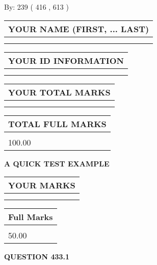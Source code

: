 \documentclass[12pt]{article}
\begin{document}
   
\hspace{1.0in} By: 
 239 ( 416 ,  613 )
   
   
   
   
\newpage 
\setcounter{page}{ 
   433001 } 
   
   
   
   
\noindent\begin{tabular}{|l|}
\hline
YOUR NAME (FIRST, ... LAST)  \\
\hline
 \\ 
 \\ 
\hline
\end{tabular}
\hspace{0.05in} \begin{tabular}{|l|}
\hline
 YOUR   ID   INFORMATION  \\
\hline
 \\ 
 \\ 
\hline
\end{tabular}
   
   
\vspace{0.2in}\noindent\begin{tabular}{|l|}
\hline
YOUR TOTAL MARKS  \\
\hline
 \\ 
 \\ 
\hline
\end{tabular}
\hspace{0.05in} \begin{tabular}{|l|}
\hline
TOTAL FULL MARKS  \\
\hline
 \\ 
100.00 \\
\hline
\end{tabular}
   
   
 \vspace{0.2in}
{\LARGE {\textbf{ A QUICK TEST EXAMPLE}}}
   
   
  
\vspace{0.2in}
  
\noindent\begin{tabular}{|l|}
\hline
 YOUR MARKS  \\
\hline
 \\ 
 \\ 
\hline
\end{tabular}
\hspace{0.05in} \begin{tabular}{|l|}
\hline
 Full Marks  \\
\hline
 \\ 
50.00 \\
\hline
\end{tabular}
{\textbf{\Large{QUESTION
433.1 
}}}
  
\end{document}
